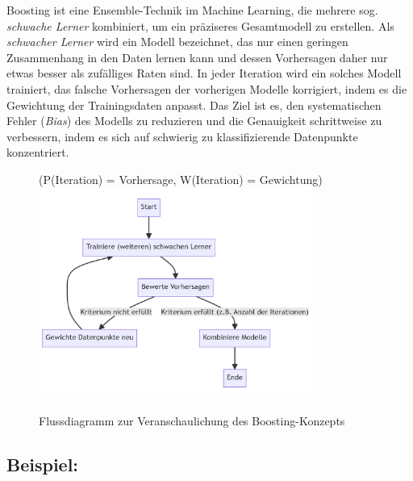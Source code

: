 Boosting ist eine Ensemble-Technik im Machine Learning, die mehrere sog. \emph{\glqq schwache Lerner\grqq} kombiniert,
um ein präziseres Gesamtmodell zu erstellen. Als \emph{schwacher Lerner} wird ein Modell bezeichnet, das nur einen geringen
Zusammenhang in den Daten lernen kann und dessen Vorhersagen daher nur etwas besser als zufälliges Raten sind.
In jeder Iteration wird ein solches Modell trainiert, das falsche
Vorhersagen der vorherigen Modelle korrigiert, indem es die Gewichtung der Trainingsdaten anpasst.
Das Ziel ist es, den systematischen Fehler (\emph{Bias}) des Modells zu reduzieren und die Genauigkeit
schrittweise zu verbessern, indem es sich auf schwierig zu klassifizierende Datenpunkte konzentriert.

\begin{figure}[h]
    (P(Iteration) = Vorhersage, W(Iteration) = Gewichtung)
    \centering
    \includegraphics[width=0.8\textwidth]{"./figures/Boosting_Graph"}
    \caption{Flussdiagramm zur Veranschaulichung des Boosting-Konzepts}
\end{figure}

\subsection*{Beispiel:}
